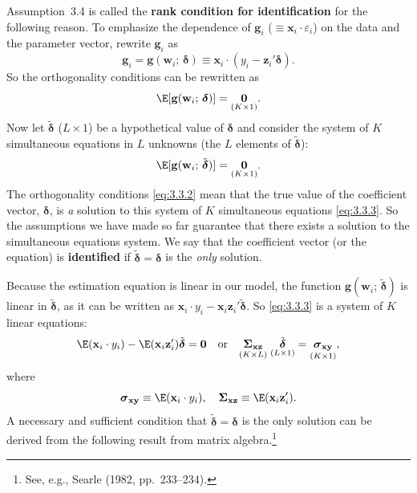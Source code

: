 Assumption~3.4 is called the \textbf{rank condition for identification} for the following
reason.  To emphasize the dependence of $\mathbf{g}_i$ ($\equiv \mathbf{x}_i \cdot \varepsilon_i$) on the data and the
parameter vector, rewrite $\mathbf{g}_i$ as
\begin{equation}
  \mathbf{g}_i = \mathbf{g}(\mathbf{w}_i;\, \boldsymbol{\delta})
  \equiv \mathbf{x}_i \cdot (y_i - \mathbf{z}_i' \boldsymbol{\delta}).
  \label{eq:3.3.1}
\end{equation}
So the orthogonality conditions can be rewritten as
\begin{equation}
  \E[\mathbf{g}(\mathbf{w}_i;\, \boldsymbol{\delta})]
  = \underset{(K \times 1)}{\mathbf{0}}.
  \label{eq:3.3.2}
\end{equation}
Now let $\tilde{\boldsymbol{\delta}}$ ($L \times 1$) be a hypothetical value of $\boldsymbol{\delta}$
and consider the system of $K$ simultaneous equations in $L$ unknowns (the $L$ elements
of $\tilde{\boldsymbol{\delta}}$):
\begin{equation}
  \E[\mathbf{g}(\mathbf{w}_i;\, \tilde{\boldsymbol{\delta}})]
  = \underset{(K \times 1)}{\mathbf{0}}.
  \label{eq:3.3.3}
\end{equation}
The orthogonality conditions \eqref{eq:3.3.2} mean that the true value of the coefficient
vector, $\boldsymbol{\delta}$, is \emph{a} solution to this system of $K$ simultaneous equations
\eqref{eq:3.3.3}.  So the assumptions we have made so far guarantee that there exists a
solution to the simultaneous equations system.  We say that the coefficient vector (or
the equation) is \textbf{identified} if $\tilde{\boldsymbol{\delta}} = \boldsymbol{\delta}$ is the
\emph{only} solution.

Because the estimation equation is linear in our model, the function
$\mathbf{g}(\mathbf{w}_i;\, \tilde{\boldsymbol{\delta}})$ is linear in $\tilde{\boldsymbol{\delta}}$,
as it can be written as
$\mathbf{x}_i \cdot y_i - \mathbf{x}_i \mathbf{z}_i' \tilde{\boldsymbol{\delta}}$.
So \eqref{eq:3.3.3} is a system of $K$ linear equations:
\begin{equation}
  \E(\mathbf{x}_i \cdot y_i) - \E(\mathbf{x}_i \mathbf{z}_i')
  \tilde{\boldsymbol{\delta}}
  = \mathbf{0}
  \quad \text{or} \quad
  \underset{(K \times L)}{\boldsymbol{\Sigma}_{\mathbf{xz}}} \;
  \underset{(L \times 1)}{\tilde{\boldsymbol{\delta}}}
  = \underset{(K \times 1)}{\boldsymbol{\sigma}_{\mathbf{xy}}},
  \label{eq:3.3.4}
\end{equation}
where
\[
  \boldsymbol{\sigma}_{\mathbf{xy}} \equiv \E(\mathbf{x}_i \cdot y_i), \quad
  \boldsymbol{\Sigma}_{\mathbf{xz}} \equiv \E(\mathbf{x}_i \mathbf{z}_i').
\]
A necessary and sufficient condition that $\tilde{\boldsymbol{\delta}} = \boldsymbol{\delta}$ is the only
solution can be derived from the following result from matrix algebra.\footnote{See, e.g.,
Searle (1982, pp.~233--234).}

